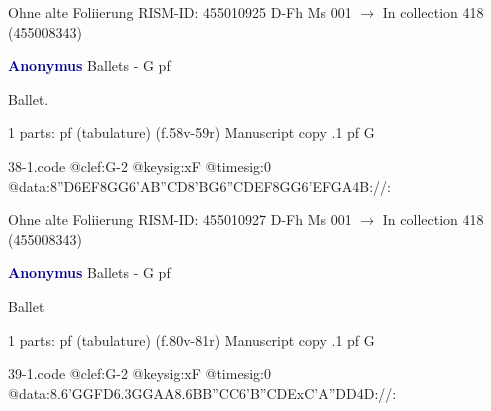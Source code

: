\documentclass[twocolumn]{book}
\begin{document}
\newline Ohne alte Foliierung
\newline RISM-ID: 455010925
\newline D-Fh  Ms 001
\newline $\rightarrow$ In collection 418 (455008343)
      
\newline \par \vspace{7pt} \textcolor{darkblue}{\textbf{Anonymus  }}
\newline Ballets - G
\newline pf
\newline \begin{itshape}[f.58v, at left:] Ballet.\end{itshape} 
\newline \textcolor{darkblue}{}  1 parts: pf (tabulature)  (f.58v-59r)
\newline Manuscript copy
.1  pf  G  
\begin{filecontents*}{38-1.code}
@clef:G-2
@keysig:xF
@timesig:0
@data:{8''D6EF8GG}{6'AB''CD}{8'BG}{6''CDEF}{8GG}{6'EFGA}4B://:
\end{filecontents*}
\newline
%

\newline Ohne alte Foliierung
\newline RISM-ID: 455010927
\newline D-Fh  Ms 001
\newline $\rightarrow$ In collection 418 (455008343)
      
\newline \par \vspace{7pt} \textcolor{darkblue}{\textbf{Anonymus  }}
\newline Ballets - G
\newline pf
\newline \begin{itshape}[f.80v, at left:] Ballet\end{itshape} 
\newline \textcolor{darkblue}{}  1 parts: pf (tabulature)  (f.80v-81r)
\newline Manuscript copy
.1  pf  G  
\begin{filecontents*}{39-1.code}
@clef:G-2
@keysig:xF
@timesig:0
@data:8.6{'GG}{FD}{6.3GGAA}{8.6BB}{''CC}{6'B''CDE}{xC'A''DD}4D://:
\end{filecontents*}
\newline
%
\end{document}
